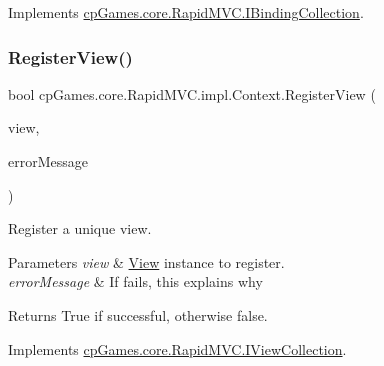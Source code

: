 Implements \mbox{\hyperlink{interfacecp_games_1_1core_1_1_rapid_m_v_c_1_1_i_binding_collection_a4ca0c71e4a254531712acbbf86e24a00}{cp\+Games.\+core.\+Rapid\+M\+V\+C.\+I\+Binding\+Collection}}.

\mbox{\label{classcp_games_1_1core_1_1_rapid_m_v_c_1_1impl_1_1_context_aaca630e99979716757f6b028b8b4aa0c}} 
\subsubsection{\texorpdfstring{RegisterView()}{RegisterView()}}
{\footnotesize\ttfamily bool cp\+Games.\+core.\+Rapid\+M\+V\+C.\+impl.\+Context.\+Register\+View (\begin{DoxyParamCaption}\item[{\mbox{\hyperlink{interfacecp_games_1_1core_1_1_rapid_m_v_c_1_1_i_view}{I\+View}}}]{view,  }\item[{out string}]{error\+Message }\end{DoxyParamCaption})}



Register a unique view. 


\begin{DoxyParams}{Parameters}
{\em view} & \mbox{\hyperlink{classcp_games_1_1core_1_1_rapid_m_v_c_1_1_view}{View}} instance to register.\\
\hline
{\em error\+Message} & If fails, this explains why\\
\hline
\end{DoxyParams}
\begin{DoxyReturn}{Returns}
True if successful, otherwise false.
\end{DoxyReturn}


Implements \mbox{\hyperlink{interfacecp_games_1_1core_1_1_rapid_m_v_c_1_1_i_view_collection_aba8465ad92ed63a4ad210c60d50cfc56}{cp\+Games.\+core.\+Rapid\+M\+V\+C.\+I\+View\+Collection}}.

\mbox{\label{classcp_games_1_1core_1_1_rapid_m_v_c_1_1impl_1_1_context_a665aa684d703ef7a67897c84274a494c}} 
